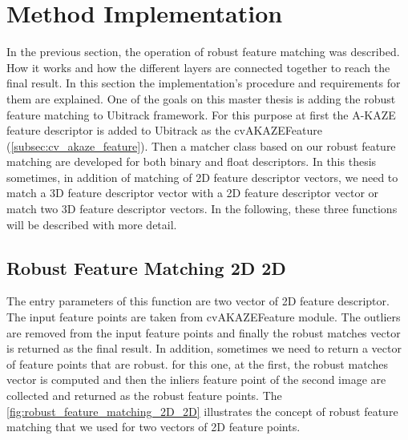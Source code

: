 \section {Method Implementation}
In the previous section, the operation of robust feature matching was described. How it works and how the different layers are connected together to reach the final result. In this section the implementation's procedure and requirements for them are explained. One of the goals on this master thesis is adding the robust feature matching to Ubitrack framework. For this purpose at first the A-KAZE feature descriptor is added to Ubitrack as the cvAKAZEFeature (\autoref{subsec:cv_akaze_feature}). Then a matcher class based on our robust feature matching are developed for both binary and float descriptors. In this thesis sometimes, in addition of matching of 2D feature descriptor vectors, we need to match a 3D feature descriptor vector with a 2D feature descriptor vector or match two 3D feature descriptor vectors. In the following, these three functions will be described with more detail.


\subsection {Robust Feature Matching 2D 2D} \label{subsec:robust_feature_matching_2D_2D}
The entry parameters of this function are two vector of 2D feature descriptor. The input feature points are taken from cvAKAZEFeature module. The outliers are removed from the input feature points and finally the robust matches vector is returned as the final result. In addition, sometimes we need to return a vector of feature points that are robust. for this one, at the first, the robust matches vector is computed and then the inliers feature point of the second image are collected and returned as the robust feature points. The \autoref{fig:robust_feature_matching_2D_2D} illustrates the concept of robust feature matching that we used for two vectors of 2D feature points.

